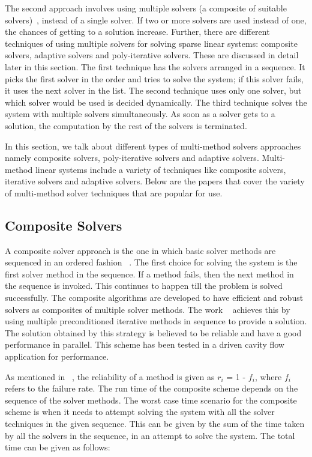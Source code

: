 The second approach involves using multiple solvers (a composite of suitable solvers)~\cite{multimethod1,multimethod2,arms,dynamic}, instead of a single solver. If two or more solvers are used instead of one, the chances of getting to a solution increase. Further, there are different techniques of using multiple solvers for solving sparse linear systems: composite solvers, adaptive solvers and poly-iterative solvers. These are discussed in detail later in this section. The first technique has the solvers arranged in a sequence. It picks the first solver in the order and tries to solve the system; if this solver fails, it uses the next solver in the list. The second technique uses only one solver, but which solver would be used is decided dynamically. The third technique solves the system with multiple solvers simultaneously. As soon as a solver gets to a solution, the computation by the rest of the solvers is terminated.

In this section, we talk about different types of multi-method solvers approaches namely composite solvers, poly-iterative solvers and adaptive solvers. Multi-method linear systems include a variety of techniques like composite solvers, iterative solvers and adaptive solvers. Below are the papers that cover the variety of multi-method solver techniques that are popular for use.

\subsection{Composite Solvers}
A composite solver approach is the one in which basic solver methods are sequenced in an ordered fashion ~\cite{composite1,composite2,composite3,composite4,composite5}. The first choice for solving the system is the first solver method in the sequence. If a method fails, then the next method in the sequence is invoked. This continues to happen till the problem is solved successfully. The composite algorithms are developed to have efficient and robust solvers as composites of multiple solver methods. The work ~\cite{composite1} achieves this by using multiple preconditioned iterative methods in sequence to provide a solution. The solution obtained by this strategy is believed to be reliable and have a good performance in parallel. This scheme has been tested in a driven cavity flow application for performance. 

As mentioned in ~\cite{composite5,composite1}, the reliability of a method is given as $r_i$ = 1 - $f_i$, where $f_i$ refers to the failure rate. The run time of the composite scheme depends on the sequence of the solver methods. The worst case time scenario for the composite scheme is when it needs to attempt solving the system with all the solver techniques in the given sequence. This can be given by the sum of the time taken by all the solvers in the sequence, in an attempt to solve the system. The total time can be given as follows: 

